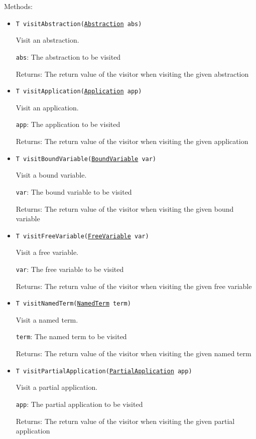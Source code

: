Methods:
\begin{itemize}
\item \texttt{T visitAbstraction(\hyperref[type:edu.kit.wavelength.client.model.term.Abstraction]{Abstraction} abs)}

Visit an abstraction.

\texttt{abs}: The abstraction to be visited

Returns: The return value of the visitor when visiting the given abstraction

\item \texttt{T visitApplication(\hyperref[type:edu.kit.wavelength.client.model.term.Application]{Application} app)}

Visit an application.

\texttt{app}: The application to be visited

Returns: The return value of the visitor when visiting the given application

\item \texttt{T visitBoundVariable(\hyperref[type:edu.kit.wavelength.client.model.term.BoundVariable]{BoundVariable} var)}

Visit a bound variable.

\texttt{var}: The bound variable to be visited

Returns: The return value of the visitor when visiting the given bound variable

\item \texttt{T visitFreeVariable(\hyperref[type:edu.kit.wavelength.client.model.term.FreeVariable]{FreeVariable} var)}

Visit a free variable.

\texttt{var}: The free variable to be visited

Returns: The return value of the visitor when visiting the given free variable

\item \texttt{T visitNamedTerm(\hyperref[type:edu.kit.wavelength.client.model.term.NamedTerm]{NamedTerm} term)}

Visit a named term.

\texttt{term}: The named term to be visited

Returns: The return value of the visitor when visiting the given named term

\item \texttt{T visitPartialApplication(\hyperref[type:edu.kit.wavelength.client.model.term.PartialApplication]{PartialApplication} app)}

Visit a partial application.

\texttt{app}: The partial application to be visited

Returns: The return value of the visitor when visiting the given partial application

\end{itemize}

